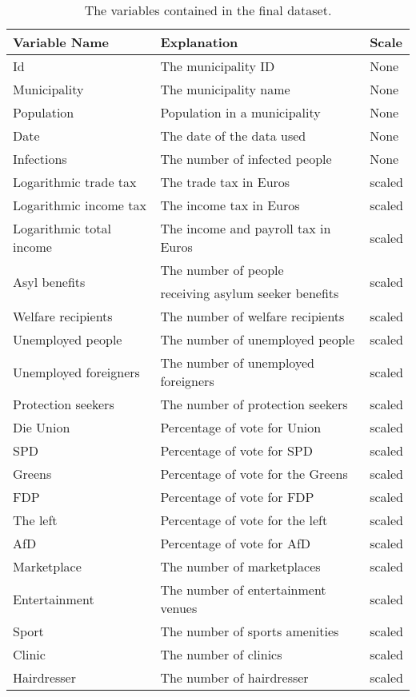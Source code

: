 \begin{table}[H] 
\caption{The variables contained in the final dataset.\label{finalGermany}}
\begin{tabular}{l l l}
\toprule
\textbf{Variable Name}	& \textbf{Explanation}	& \textbf{Scale}\\
\midrule
Id & The municipality ID & None\\
Municipality & The municipality name & None \\
Population & Population in a municipality & None \\
Date & The date of the data used & None\\
Infections & The number of infected people & None \\
Logarithmic trade tax & The trade tax in Euros & scaled \\
Logarithmic income tax & The income tax in Euros & scaled \\
Logarithmic total income & The income and payroll tax in Euros & scaled \\
\multirow{2}{*}{Asyl benefits} & The number of people & \multirow{2}{*}{scaled} \\
& receiving asylum seeker benefits \\
Welfare recipients & The number of welfare recipients & scaled \\
Unemployed people & The number of unemployed people & scaled \\
Unemployed foreigners & The number of unemployed foreigners & scaled \\
Protection seekers & The number of protection seekers & scaled \\
Die Union & Percentage of vote for Union & scaled\\
SPD & Percentage of vote for SPD & scaled\\
Greens & Percentage of vote for the Greens & scaled\\
FDP & Percentage of vote for FDP & scaled\\
The left & Percentage of vote for the left & scaled\\
AfD & Percentage of vote for AfD & scaled \\
Marketplace & The number of marketplaces & scaled \\
Entertainment & The number of entertainment venues & scaled \\
Sport & The number of sports amenities & scaled \\
Clinic & The number of clinics & scaled \\
Hairdresser & The number of hairdresser & scaled \\

\end{tabular}
\end{table}
